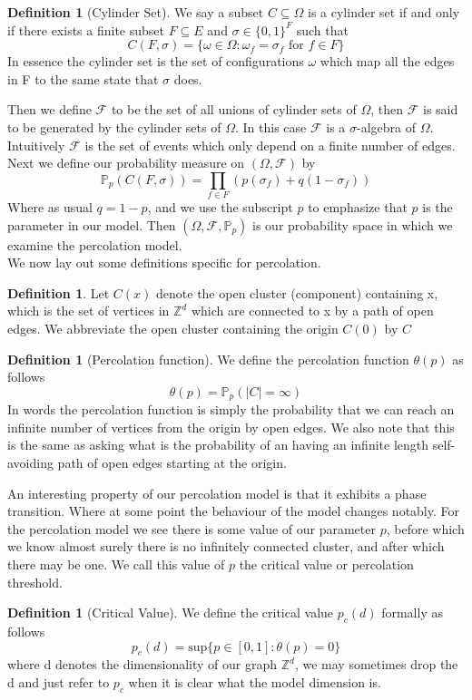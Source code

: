 \documentclass[a4paper,11pt]{article}
\theoremstyle{definition}
\newtheorem{definition}[theorem]{Definition}
\newcommand{\ints}{\mathbb{Z}}
\newcommand{\sigalg}{$\sigma$-algebra }
\newcommand{\prob}{\mathbb{P}_p}
\begin{document}
\begin{definition}[Cylinder Set]
	We say a subset $C \subseteq \Omega$ is a cylinder set if and only if there exists a finite subset $F \subseteq E$ and $\sigma \in \{0,1\}^F$ such that 
	$$C(F,\sigma) = \{\omega \in \Omega: \omega_f = \sigma_f \text{ for }f \in F\}$$
	In essence the cylinder set is the set of configurations $\omega$ which map all the edges in F to the same state that $\sigma$ does.
\end{definition}

Then we define $\mathcal{F}$ to be the set of all unions of cylinder sets of $\Omega$, then $\mathcal{F}$ is said to be generated by the cylinder sets of $\Omega$.
In this case $\mathcal{F}$ is a \sigalg of $\Omega$. Intuitively $\mathcal{F}$ is the set of events which only depend on a finite number of edges.\\
Next we define our probability measure on $(\Omega, \mathcal{F})$ by 
$$\prob(C(F,\sigma)) = \prod_{f \in F} (p(\sigma_f) + q(1-\sigma_f)) $$
Where as usual $q = 1-p$, and we use the subscript $p$ to emphasize that $p$ is the parameter in our model. Then $(\Omega, \mathcal{F}, \prob)$ is our probability space in which we examine the percolation model.
\\
We now lay out some definitions specific for percolation.
\begin{definition}
	Let $C(x)$ denote the open cluster (component) containing x, which is the set of vertices in $\ints^d$ which are connected to x by a path of open edges.
	We abbreviate the open cluster containing the origin $C(0)$ by $C$
\end{definition}

\begin{definition}[Percolation function]{
	We define the percolation function $\theta(p)$ as follows
	$$\theta(p) = \prob(|C| = \infty)$$
	In words the percolation function is simply the probability that we can reach an infinite number of vertices from the origin by open edges. 
	We also note that this is the same as asking what is the probability of an having an infinite length self-avoiding path of open edges starting at the origin.
}
	
\end{definition}
An interesting property of our percolation model is that it exhibits a phase transition. Where at some point the behaviour of the model changes notably.
For the percolation model we see there is some value of our parameter $p$, before which we know almost surely there is no infinitely connected cluster, and after which there may be one.
We call this value of $p$ the critical value or percolation threshold.
\begin{definition}[Critical Value]
	We define the critical value $p_c(d)$ formally as follows
	$$p_c(d) = \text{sup}\{p \in [0,1]: \theta(p)=0\} $$
	where d denotes the dimensionality of our graph $\ints^d$, we may sometimes drop the d and just refer to $p_c$ when it is clear what the model dimension is.
\end{definition}
\end{document}
